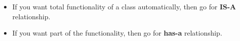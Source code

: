 \setlength{\columnsep}{3pt}
\begin{flushleft}
	\begin{itemize}
		\item If you want total functionality of a class automatically, then go for \textbf{IS-A} relationship.
		\item If you want part of the functionality, then go for \textbf{has-a} relationship.
	\end{itemize}
	\bigskip
	
\end{flushleft}
\newpage


